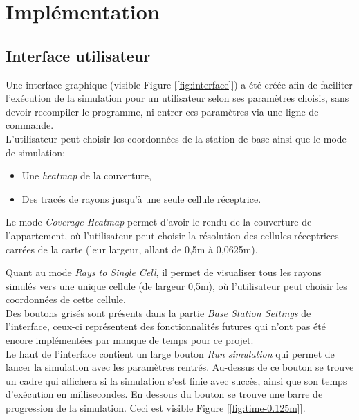 \chapter{Implémentation}
\label{chapter-2}




\section{Interface utilisateur}
Une interface graphique (visible Figure [\ref{fig:interface}]) a été créée afin de faciliter l'exécution de la simulation pour un utilisateur selon ses paramètres choisis, sans devoir recompiler le programme, ni entrer ces paramètres via une ligne de commande.\\

L'utilisateur peut choisir les coordonnées de la station de base ainsi que le mode de simulation:
\begin{itemize}
    \item Une \textit{heatmap} de la couverture,
    \item Des tracés de rayons jusqu'à une seule cellule réceptrice.
\end{itemize}

Le mode \textit{Coverage Heatmap} permet d'avoir le rendu de la couverture de l'appartement, où l'utilisateur peut choisir la résolution des cellules réceptrices carrées de la carte (leur largeur, allant de 0,5m à 0,0625m).

Quant au mode \textit{Rays to Single Cell}, il permet de visualiser tous les rayons simulés vers une unique cellule (de largeur 0,5m), où l'utilisateur peut choisir les coordonnées de cette cellule.\\

Des boutons grisés sont présents dans la partie \textit{Base Station Settings} de l'interface, ceux-ci représentent des fonctionnalités futures qui n'ont pas été encore implémentées par manque de temps pour ce projet.\\

Le haut de l'interface contient un large bouton \textit{Run simulation} qui permet de lancer la simulation avec les paramètres rentrés. Au-dessus de ce bouton se trouve un cadre qui affichera si la simulation s'est finie avec succès, ainsi que son temps d'exécution en millisecondes. En dessous du bouton se trouve une barre de progression de la simulation. Ceci est visible Figure [\ref{fig:time-0.125m}].\\

